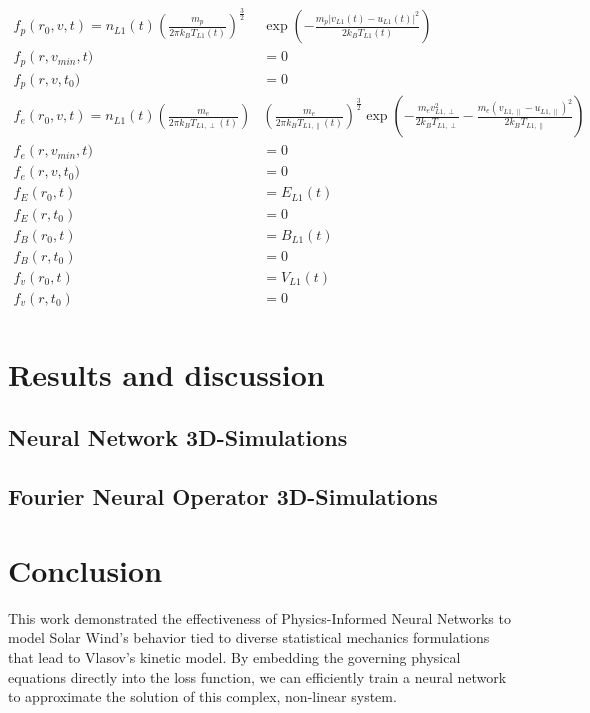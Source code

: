 \documentclass[12pt]{article}
\begin{document}
\begin{align*}
    f_p(r_0, v, t) = n_{L1}(t) \left( \frac{m_p}{2 \pi k_B T_{L1}(t)}\right)^{\frac{3}{2}}& \exp\left({-\frac{m_p | v_{L1}(t) - u_{L1}(t) |^2}{2k_BT_{L1}(t)}}  \right) \\
    f_p\left(r, v_{min}, t) &= 0 \\
    f_p\left(r, v, t_0) &= 0 \\
    f_e(r_0, v, t) = n_{L1}(t) \left( \frac{m_e}{2 \pi k_B T_{L1, \perp}(t)}\right)&\left( \frac{m_e}{2 \pi k_B T_{L1, \parallel}(t)}\right)^{\frac{3}{2}} \exp\left(-\frac{m_ev_{L1, \perp}^2}{2k_BT_{L1, \perp}} - \frac{m_e (v_{L1, \parallel} - u_{L1, \parallel})^2}{2k_BT_{L1, \parallel}}\right) \\
    f_e\left(r, v_{min}, t) &= 0 \\
    f_e\left(r, v, t_0) &= 0 \\
    f_E\left(r_0, t\right) &= E_{L1}(t) \\
    f_E\left(r, t_0\right) &= 0 \\
    f_B\left(r_0, t\right) &= B_{L1}(t) \\
    f_B\left(r, t_0\right) &= 0 \\
    f_v\left(r_0, t\right) &= V_{L1}(t) \\
    f_v\left(r, t_0\right) &= 0 \\
\end{align*}


\section{Results and discussion}

\subsection{Neural Network 3D-Simulations}

\subsection{Fourier Neural Operator 3D-Simulations}

\section{Conclusion}
This work demonstrated the effectiveness of Physics-Informed Neural Networks to model Solar Wind's behavior tied to diverse statistical mechanics formulations that lead to Vlasov's kinetic model. By embedding the governing physical equations directly into the loss function, we can efficiently train a neural network to approximate the solution of this complex, non-linear system.
\end{document}
